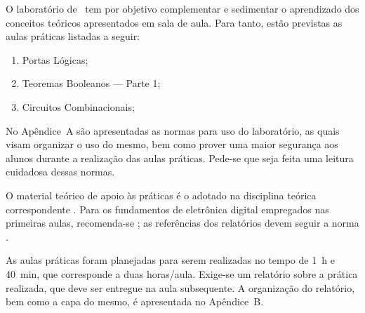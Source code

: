 
O laboratório de \nomeunidade\ tem por objetivo complementar e sedimentar o
aprendizado dos conceitos teóricos apresentados em sala de aula. Para tanto, estão
previstas as aulas práticas listadas a seguir:

\begin{enumerate}
	\item Portas Lógicas;
	\item Teoremas Booleanos --- Parte 1;
	\item Circuitos Combinacionais;
\end{enumerate}

No Apêndice~A são apresentadas as normas para uso do laboratório, as quais visam
organizar o uso do mesmo, bem como prover uma maior segurança aos alunos durante a
realização das aulas práticas. Pede-se que seja feita uma leitura cuidadosa dessas
normas.

O material teórico de apoio às práticas é o adotado na disciplina teórica
correspondente \cite{ogata2010,nise2017}. Para os fundamentos de eletrônica digital
empregados nas primeiras aulas, recomenda-se \textcite{tocci2018}; as referências dos
relatórios devem seguir a norma \cite{nbr6023}.

As aulas práticas foram planejadas para serem realizadas no tempo de \qty{1}{\hour} e \qty{40}{\minute}, que
corresponde a duas horas/aula. Exige-se um relatório sobre a prática realizada, que
deve ser entregue na aula subsequente. A organização do relatório, bem como a capa do
mesmo, é apresentada no Apêndice~B.